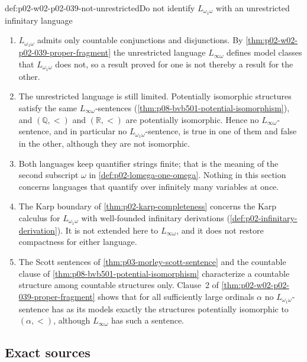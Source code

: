 \begin{hbwarning}{def:p02-w02-p02-039-not-unrestricted}{Do not identify \(L_{\omega_1\omega}\) with an unrestricted infinitary language}
\begin{enumerate}
\item \(L_{\omega_1\omega}\) admits only countable conjunctions and
      disjunctions.  By \cref{thm:p02-w02-p02-039-proper-fragment} the
      unrestricted language \(L_{\infty\omega}\) defines model classes that
      \(L_{\omega_1\omega}\) does not, so a result proved for one is not
      thereby a result for the other.
\item The unrestricted language is still limited.  Potentially isomorphic
      structures satisfy the same \(L_{\infty\omega}\)-sentences
      (\cref{thm:p08-bvb501-potential-isomorphism}), and \((\mathbb Q,<)\)
      and \((\mathbb R,<)\) are potentially isomorphic.  Hence no
      \(L_{\infty\omega}\)-sentence, and in particular no
      \(L_{\omega_1\omega}\)-sentence, is true in one of them and false in
      the other, although they are not isomorphic.
\item Both languages keep quantifier strings finite; that is the meaning of
      the second subscript \(\omega\) in \cref{def:p02-lomega-one-omega}.
      Nothing in this section concerns languages that quantify over
      infinitely many variables at once.
\item The Karp boundary of \cref{thm:p02-karp-completeness} concerns the
      Karp calculus for \(L_{\omega_1\omega}\) with well-founded infinitary
      derivations (\cref{def:p02-infinitary-derivation}).  It is not
      extended here to \(L_{\infty\omega}\), and it does not restore
      compactness for either language.
\item The Scott sentences of \cref{thm:p03-morley-scott-sentence} and the
      countable clause of \cref{thm:p08-bvb501-potential-isomorphism}
      characterize a countable structure among countable structures only.
      Clause~2 of \cref{thm:p02-w02-p02-039-proper-fragment} shows that
      for all sufficiently large ordinals \(\alpha\) no
      \(L_{\omega_1\omega}\)-sentence has as its models exactly the
      structures potentially isomorphic to \((\alpha,<)\), although
      \(L_{\infty\omega}\) has such a sentence.
\end{enumerate}
\end{hbwarning}

\subsection{Exact sources}
\label{sec:p02-w02-p02-039-sources}

